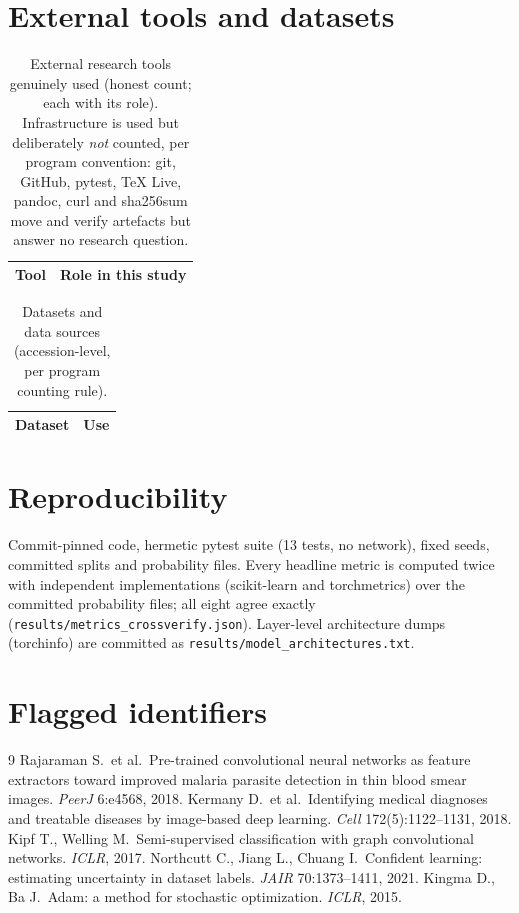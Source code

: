 \documentclass[11pt]{article}
\theoremstyle{definition}
\begin{document}
\section{External tools and datasets}
\begin{longtable}{p{}p{}}
\caption{External research tools genuinely used (honest count; each
with its role). Infrastructure is used but deliberately \emph{not} counted,
per program convention: git, GitHub, pytest, TeX Live, pandoc, curl and
sha256sum move and verify artefacts but answer no research
question.}\label{tab:tools}\\
\hline Tool & Role in this study \\ \hline \endhead
\end{longtable}
\begin{longtable}{p{}p{}}
\caption{Datasets and data sources (accession-level, per program counting rule).}\label{tab:datasets}\\
\hline Dataset & Use \\ \hline \endhead
\end{longtable}
\section{Reproducibility}
Commit-pinned code, hermetic pytest suite (13 tests, no network), fixed
seeds, committed splits and probability files. Every headline metric is
computed twice with independent implementations (scikit-learn and
torchmetrics) over the committed probability files; all eight agree
exactly (\texttt{results/metrics\_crossverify.json}). Layer-level
architecture dumps (torchinfo) are committed as
\texttt{results/model\_architectures.txt}.
\appendix
\section{Flagged identifiers}

\begin{thebibliography}{9}
 Rajaraman S.\ et al.\ Pre-trained convolutional
neural networks as feature extractors toward improved malaria parasite
detection in thin blood smear images. \emph{PeerJ} 6:e4568, 2018.
 Kermany D.\ et al.\ Identifying medical diagnoses and
treatable diseases by image-based deep learning. \emph{Cell} 172(5):1122--1131, 2018.
 Kipf T., Welling M.\ Semi-supervised classification with
graph convolutional networks. \emph{ICLR}, 2017.
 Northcutt C., Jiang L., Chuang I.\ Confident
learning: estimating uncertainty in dataset labels. \emph{JAIR} 70:1373--1411, 2021.
 Kingma D., Ba J.\ Adam: a method for stochastic
optimization. \emph{ICLR}, 2015.
\end{thebibliography}
\end{document}
